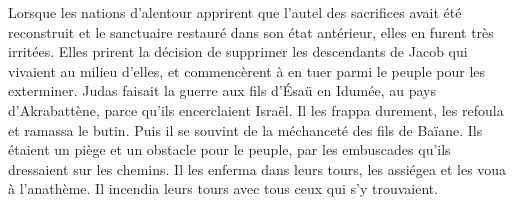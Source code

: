 Lorsque les nations d’alentour apprirent que l’autel des sacrifices avait été reconstruit
	et le sanctuaire restauré dans son état antérieur,
	elles en furent très irritées.
Elles prirent la décision
		de supprimer les descendants de Jacob qui vivaient au milieu d’elles,
	et commencèrent à en tuer parmi le peuple pour les exterminer.
Judas faisait la guerre aux fils d’Ésaü en Idumée, au pays d’Akrabattène,
	parce qu’ils encerclaient Israël.
	Il les frappa durement, les refoula et ramassa le butin.
Puis il se souvint de la méchanceté des fils de Baïane.
	Ils étaient un piège et un obstacle pour le peuple,
	par les embuscades qu’ils dressaient sur les chemins.
Il les enferma dans leurs tours, les assiégea et les voua à l’anathème.
	Il incendia leurs tours avec tous ceux qui s’y trouvaient.
